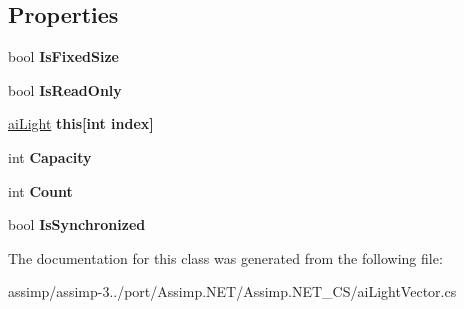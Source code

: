 \subsection*{Properties}
\begin{DoxyCompactItemize}
\item 
\hypertarget{classai_light_vector_a54b70f53d5bb77f942913f0088eddb55}{bool {\bfseries Is\+Fixed\+Size}}\label{classai_light_vector_a54b70f53d5bb77f942913f0088eddb55}

\item 
\hypertarget{classai_light_vector_aa06d065e147822929b66638602beb028}{bool {\bfseries Is\+Read\+Only}}\label{classai_light_vector_aa06d065e147822929b66638602beb028}

\item 
\hypertarget{classai_light_vector_a2ba31d10389abed51ceedf443ad34948}{\hyperlink{structai_light}{ai\+Light} {\bfseries this\mbox{[}int index\mbox{]}}}\label{classai_light_vector_a2ba31d10389abed51ceedf443ad34948}

\item 
\hypertarget{classai_light_vector_a5d148a441dad7469145354b201c915f2}{int {\bfseries Capacity}}\label{classai_light_vector_a5d148a441dad7469145354b201c915f2}

\item 
\hypertarget{classai_light_vector_a4564e16124fb4f7b526fdae2e8f45df8}{int {\bfseries Count}}\label{classai_light_vector_a4564e16124fb4f7b526fdae2e8f45df8}

\item 
\hypertarget{classai_light_vector_a620db64bf107e07677f43952d57a290b}{bool {\bfseries Is\+Synchronized}}\label{classai_light_vector_a620db64bf107e07677f43952d57a290b}

\end{DoxyCompactItemize}


The documentation for this class was generated from the following file\+:\begin{DoxyCompactItemize}
\item 
assimp/assimp-\/3../port/\+Assimp.\+N\+E\+T/\+Assimp.\+N\+E\+T\+\_\+\+C\+S/ai\+Light\+Vector.\+cs\end{DoxyCompactItemize}
